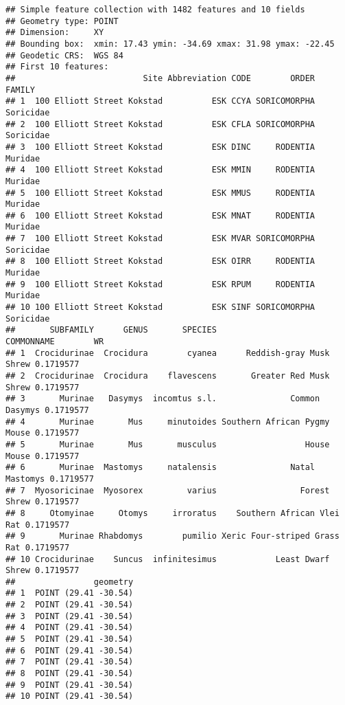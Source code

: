 \documentclass[
]{book}
\newenvironment{Shaded}{\begin{snugshade}}{\end{snugshade}}
\newcommand{\CommentTok}[1]{\textcolor[rgb]{0.56,0.35,0.01}{\textit{#1}}}
\newcommand{\FunctionTok}[1]{\textcolor[rgb]{0.00,0.00,0.00}{#1}}
\newcommand{\NormalTok}[1]{#1}
\newcommand{\OtherTok}[1]{\textcolor[rgb]{0.56,0.35,0.01}{#1}}
\newcommand{\SpecialCharTok}[1]{\textcolor[rgb]{0.00,0.00,0.00}{#1}}
\begin{document}
\begin{Shaded}
\end{Shaded}

\begin{verbatim}
## Simple feature collection with 1482 features and 10 fields
## Geometry type: POINT
## Dimension:     XY
## Bounding box:  xmin: 17.43 ymin: -34.69 xmax: 31.98 ymax: -22.45
## Geodetic CRS:  WGS 84
## First 10 features:
##                          Site Abbreviation CODE        ORDER    FAMILY
## 1  100 Elliott Street Kokstad          ESK CCYA SORICOMORPHA Soricidae
## 2  100 Elliott Street Kokstad          ESK CFLA SORICOMORPHA Soricidae
## 3  100 Elliott Street Kokstad          ESK DINC     RODENTIA   Muridae
## 4  100 Elliott Street Kokstad          ESK MMIN     RODENTIA   Muridae
## 5  100 Elliott Street Kokstad          ESK MMUS     RODENTIA   Muridae
## 6  100 Elliott Street Kokstad          ESK MNAT     RODENTIA   Muridae
## 7  100 Elliott Street Kokstad          ESK MVAR SORICOMORPHA Soricidae
## 8  100 Elliott Street Kokstad          ESK OIRR     RODENTIA   Muridae
## 9  100 Elliott Street Kokstad          ESK RPUM     RODENTIA   Muridae
## 10 100 Elliott Street Kokstad          ESK SINF SORICOMORPHA Soricidae
##       SUBFAMILY      GENUS       SPECIES                   COMMONNAME        WR
## 1  Crocidurinae  Crocidura        cyanea      Reddish-gray Musk Shrew 0.1719577
## 2  Crocidurinae  Crocidura    flavescens       Greater Red Musk Shrew 0.1719577
## 3       Murinae   Dasymys  incomtus s.l.               Common Dasymys 0.1719577
## 4       Murinae       Mus     minutoides Southern African Pygmy Mouse 0.1719577
## 5       Murinae       Mus       musculus                  House Mouse 0.1719577
## 6       Murinae  Mastomys     natalensis               Natal Mastomys 0.1719577
## 7  Myosoricinae  Myosorex         varius                 Forest Shrew 0.1719577
## 8     Otomyinae     Otomys     irroratus    Southern African Vlei Rat 0.1719577
## 9       Murinae Rhabdomys        pumilio Xeric Four-striped Grass Rat 0.1719577
## 10 Crocidurinae    Suncus  infinitesimus            Least Dwarf Shrew 0.1719577
##                geometry
## 1  POINT (29.41 -30.54)
## 2  POINT (29.41 -30.54)
## 3  POINT (29.41 -30.54)
## 4  POINT (29.41 -30.54)
## 5  POINT (29.41 -30.54)
## 6  POINT (29.41 -30.54)
## 7  POINT (29.41 -30.54)
## 8  POINT (29.41 -30.54)
## 9  POINT (29.41 -30.54)
## 10 POINT (29.41 -30.54)
\end{verbatim}
\end{document}
